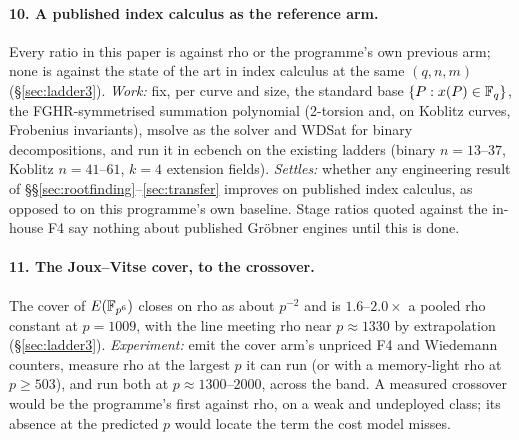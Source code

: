 \paragraph{10. A published index calculus as the reference arm.} Every
ratio in this paper is against rho or the programme's own previous arm;
none is against the state of the art in index calculus at the same
$(q,n,m)$ (\S\ref{sec:ladder3}). \emph{Work:} fix, per curve and size, the
standard base $\{P:x(P)\in\mathbb{F}_q\}$, the FGHR-symmetrised summation
polynomial (2-torsion and, on Koblitz curves, Frobenius invariants), msolve
as the solver and WDSat for binary decompositions, and run it in ecbench
on the existing ladders (binary $n=13$--$37$, Koblitz $n=41$--$61$, $k=4$
extension fields). \emph{Settles:} whether any engineering result of
\S\S\ref{sec:rootfinding}--\ref{sec:transfer} improves on published index
calculus, as opposed to on this programme's own baseline. Stage ratios
quoted against the in-house F4 say nothing about published Gr\"obner
engines until this is done.

\paragraph{11. The Joux--Vitse cover, to the crossover.} The cover of
$E(\mathbb{F}_{p^6})$ closes on rho as about $p^{-2}$ and is $1.6$--$2.0\times$ a
pooled rho constant at $p=1009$, with the line meeting rho near
$p\approx1330$ by extrapolation (\S\ref{sec:ladder3}). \emph{Experiment:}
emit the cover arm's unpriced F4 and Wiedemann counters, measure rho at the
largest $p$ it can run (or with a memory-light rho at $p\ge503$), and run
both at $p\approx1300$--$2000$, across the band. A measured crossover would
be the programme's first  against rho, on a weak and undeployed
class; its absence at the predicted $p$ would locate the term the cost
model misses.

